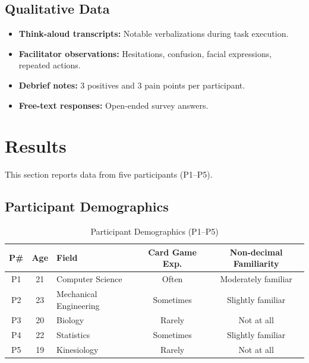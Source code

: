 \documentclass[12pt, titlepage]{article}
\begin{document}
\subsection{Qualitative Data}

\begin{itemize}
  \item \textbf{Think-aloud transcripts:} Notable verbalizations during task execution.
  \item \textbf{Facilitator observations:} Hesitations, confusion, facial expressions, repeated actions.
  \item \textbf{Debrief notes:} 3 positives and 3 pain points per participant.
  \item \textbf{Free-text responses:} Open-ended survey answers.
\end{itemize}



\section{Results}\label{sec:results}

This section reports data from five participants (P1--P5).

\subsection{Participant Demographics}

\begin{table}[H]
\centering
\caption{Participant Demographics (P1--P5)}
\begin{tabular}{c c l c c}
\toprule
\textbf{P\#} & \textbf{Age} & \textbf{Field} & \textbf{Card Game Exp.} & \textbf{Non-decimal Familiarity} \\
\midrule
P1 & 21 & Computer Science & Often & Moderately familiar \\
P2 & 23 & Mechanical Engineering & Sometimes & Slightly familiar \\
P3 & 20 & Biology & Rarely & Not at all \\
P4 & 22 & Statistics & Sometimes & Slightly familiar \\
P5 & 19 & Kinesiology & Rarely & Not at all \\
\bottomrule
\end{tabular}
\end{table}
\end{document}
